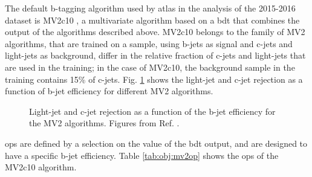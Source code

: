 The default b-tagging algorithm used by \gls{atlas} in the analysis of the 2015-2016 dataset is MV2c10 
\cite{ATL-PHYS-PUB-2015-022,ATL-PHYS-PUB-2016-012}, 
a multivariate algorithm based on a \gls{bdt} that combines the output of the algorithms described above. 
MV2c10 belongs to the family of MV2 algorithms, that are trained on a \ttbar sample, using b-jets as signal and c-jets and light-jets as background, differ in the relative fraction of c-jets and light-jets that are
used in the training; in the case of MV2c10, the background sample in the training contains 15\% of c-jets.
Fig. \ref{fig:obj:mv2} shows the light-jet and c-jet rejection as a function of b-jet efficiency for different MV2 algorithms.

\begin{figure}[h]
\begin{center}
\end{center}
 \caption{Light-jet  and c-jet  rejection as a function of the b-jet efficiency for the MV2 algorithms. Figures from Ref. \cite{ATL-PHYS-PUB-2016-012}.}
  \label{fig:obj:mv2}
\end{figure}

\glspl{op} are defined by a selection on the value of the \gls{bdt} output, and are designed to have a specific b-jet efficiency.
Table \ref{tab:obj:mv2op} shows the \glspl{op} of the MV2c10 algorithm.

